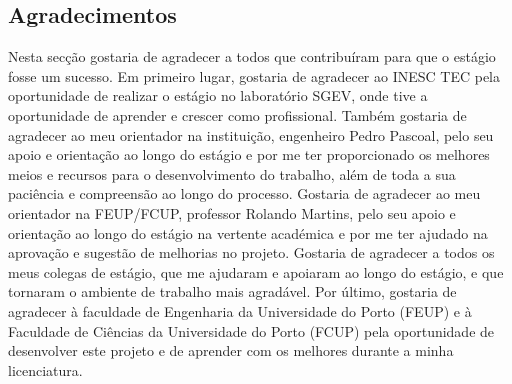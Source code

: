 \subsection{Agradecimentos}
Nesta secção gostaria de agradecer a todos que contribuíram para que o estágio fosse um sucesso. Em primeiro lugar, gostaria de 
agradecer ao INESC TEC pela oportunidade de realizar o estágio no laboratório SGEV, onde tive a oportunidade de aprender e crescer como 
profissional. Também gostaria de agradecer ao meu orientador na instituição, engenheiro Pedro Pascoal, pelo seu apoio e orientação ao 
longo do estágio e por me ter proporcionado os melhores meios e recursos para o desenvolvimento do trabalho, além de toda a sua paciência 
e compreensão ao longo do processo. Gostaria de agradecer ao meu orientador na FEUP/FCUP, professor Rolando Martins, pelo seu apoio e 
orientação ao longo do estágio na vertente académica e por me ter ajudado na aprovação e sugestão de melhorias no projeto. Gostaria de 
agradecer a todos os meus colegas de estágio, que me ajudaram e apoiaram ao longo do estágio, e que tornaram o ambiente de trabalho mais agradável.
Por último, gostaria de agradecer à faculdade de Engenharia da Universidade do Porto (FEUP) e à Faculdade de Ciências da Universidade do 
Porto (FCUP) pela oportunidade de desenvolver este projeto e de aprender com os melhores durante a minha licenciatura.